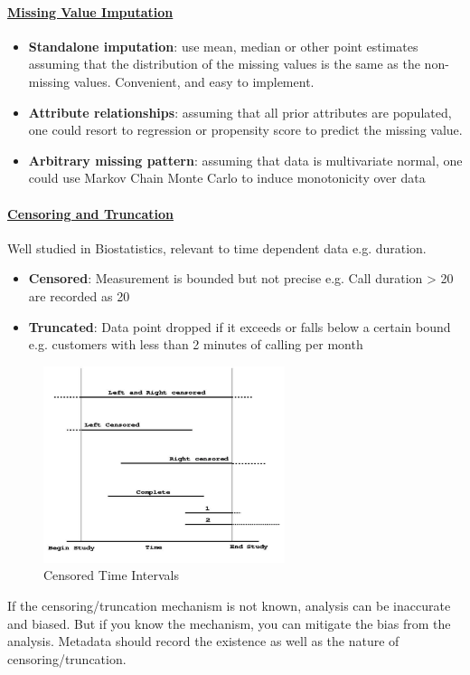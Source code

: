 \documentclass[10pt,a4paper]{article}
\begin{document}
\paragraph{\uline{Missing Value Imputation}}
\begin{itemize}
	\item \textbf{Standalone imputation}: use mean, median or other point estimates assuming that the distribution of the missing values is the same as the non-missing values. Convenient, and easy to implement.
	\item \textbf{Attribute relationships}: assuming that all prior attributes are populated, one could resort to regression or propensity score to predict the missing value.
	\item \textbf{Arbitrary missing pattern}: assuming that data is multivariate normal, one could use Markov Chain Monte Carlo to induce monotonicity over data
\end{itemize}
\paragraph{\uline{Censoring and Truncation}} Well studied in Biostatistics, relevant to time dependent data e.g. duration.
\begin{itemize}
	\item \textbf{Censored}: Measurement is bounded but not precise e.g. Call duration > 20 are recorded as 20
	\item \textbf{Truncated}: Data point dropped if it exceeds or falls below a certain bound e.g. customers with less than 2 minutes of calling per month
\end{itemize}
\begin{figure}[ht!]
 \hfill \includegraphics[width=200pt]{images/censored-time-intervals}
 \hspace*{\fill}
 \caption{Censored Time Intervals}
 \end{figure} 
If the censoring/truncation mechanism is not known, analysis can be inaccurate and biased. But if you know the mechanism, you can mitigate the bias from the analysis. Metadata should record the existence as well as the nature of censoring/truncation.
\pagebreak
\end{document}
